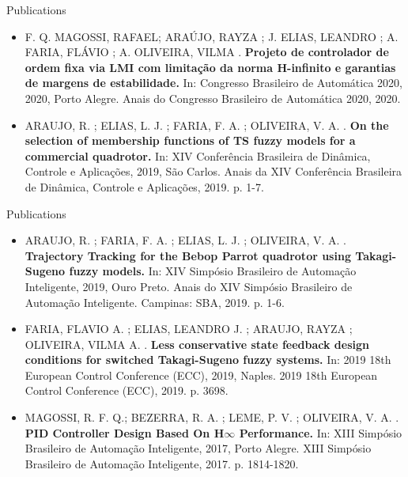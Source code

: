 \begin{frame}{Publications}
	\begin{itemize}
		\item F. Q. MAGOSSI, RAFAEL; ARAÚJO, RAYZA ; J. ELIAS, LEANDRO ; A. FARIA, FLÁVIO ; A. OLIVEIRA, VILMA . \textbf{Projeto de controlador de ordem fixa via LMI com limitação da norma H-infinito e garantias de margens de estabilidade.} In: Congresso Brasileiro de Automática 2020, 2020, Porto Alegre. Anais do Congresso Brasileiro de Automática 2020, 2020. 
		
		\item ARAUJO, R. ; ELIAS, L. J. ; FARIA, F. A. ; OLIVEIRA, V. A. . \textbf{On the selection of membership functions of TS fuzzy models for a commercial quadrotor.} In: XIV Conferência Brasileira de Dinâmica, Controle e Aplicações, 2019, São Carlos. Anais da XIV Conferência Brasileira de Dinâmica, Controle e Aplicações, 2019. p. 1-7. 
	\end{itemize}
\end{frame}

\begin{frame}{Publications}
	\begin{itemize}
		\item ARAUJO, R. ; FARIA, F. A. ; ELIAS, L. J. ; OLIVEIRA, V. A. . \textbf{Trajectory Tracking for the Bebop Parrot quadrotor using Takagi-Sugeno fuzzy models.} In: XIV Simpósio Brasileiro de Automação Inteligente, 2019, Ouro Preto. Anais do XIV Simpósio Brasileiro de Automação Inteligente. Campinas: SBA, 2019. p. 1-6. 
		
		\item FARIA, FLAVIO A. ; ELIAS, LEANDRO J. ; ARAUJO, RAYZA ; OLIVEIRA, VILMA A. . \textbf{Less conservative state feedback design conditions for switched Takagi-Sugeno fuzzy systems. }In: 2019 18th European Control Conference (ECC), 2019, Naples. 2019 18th European Control Conference (ECC), 2019. p. 3698. 
		
		\item MAGOSSI, R. F. Q.; BEZERRA, R. A. ; LEME, P. V. ; OLIVEIRA, V. A. . \textbf{PID Controller Design Based On H$\infty$ Performance.} In: XIII Simpósio Brasileiro de Automação Inteligente, 2017, Porto Alegre. XIII Simpósio Brasileiro de Automação Inteligente, 2017. p. 1814-1820.
	\end{itemize}
\end{frame}


